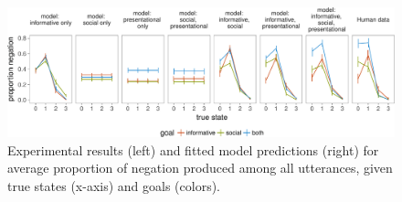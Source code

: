 \documentclass[12pt]{article}
\begin{document}
\begin{figure}[!h]
\includegraphics[width=\textwidth]{polite_manuscript_files/figure-latex/negation-1} \caption{Experimental results (left) and fitted model predictions (right) for average proportion of negation produced among all utterances, given true states (x-axis) and goals (colors).}\label{fig:negation}
\end{figure}






%
\end{document}
